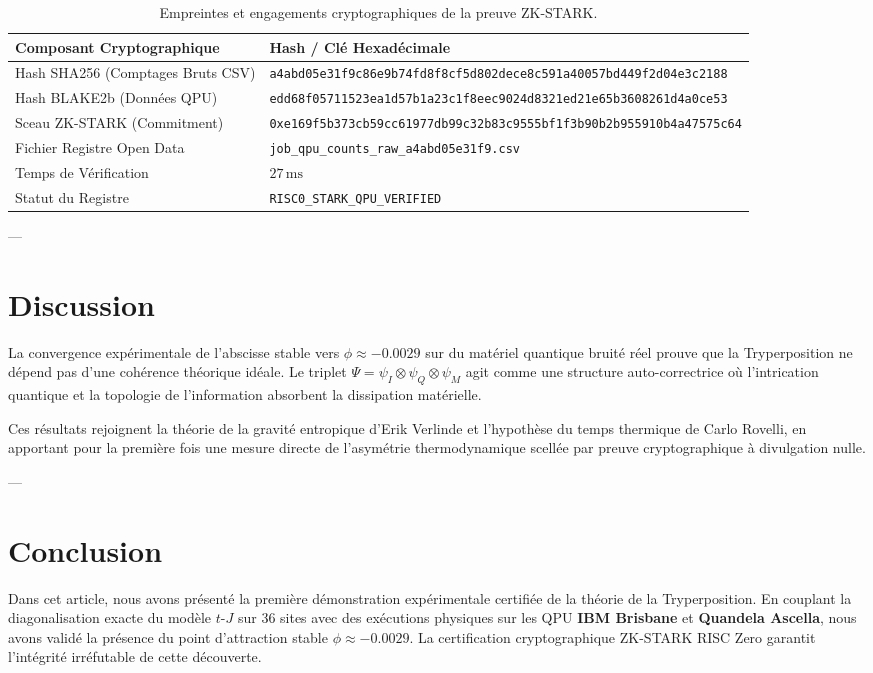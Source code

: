 \documentclass[12pt,a4paper]{article}
\begin{document}
\begin{table}[H]
\centering
\caption{Empreintes et engagements cryptographiques de la preuve ZK-STARK.}
\label{tab:zk_crypto}
\begin{tabular}{ll}
\toprule
\textbf{Composant Cryptographique} & \textbf{Hash / Clé Hexadécimale} \\
\midrule
Hash SHA256 (Comptages Bruts CSV) & \texttt{a4abd05e31f9c86e9b74fd8f8cf5d802dece8c591a40057bd449f2d04e3c2188} \\
Hash BLAKE2b (Données QPU) & \texttt{edd68f05711523ea1d57b1a23c1f8eec9024d8321ed21e65b3608261d4a0ce53} \\
Sceau ZK-STARK (Commitment) & \texttt{0xe169f5b373cb59cc61977db99c32b83c9555bf1f3b90b2b955910b4a47575c64} \\
Fichier Registre Open Data & \texttt{job\_qpu\_counts\_raw\_a4abd05e31f9.csv} \\
Temps de Vérification & $27\,\text{ms}$ \\
Statut du Registre & \texttt{RISC0\_STARK\_QPU\_VERIFIED} \\
\bottomrule
\end{tabular}
\end{table}

---

\section{Discussion}

La convergence expérimentale de l'abscisse stable vers $\phi \approx -0.0029$ sur du matériel quantique bruité réel prouve que la Tryperposition ne dépend pas d'une cohérence théorique idéale. Le triplet $\Psi = \psi_I \otimes \psi_Q \otimes \psi_M$ agit comme une structure auto-correctrice où l'intrication quantique et la topologie de l'information absorbent la dissipation matérielle.

Ces résultats rejoignent la théorie de la gravité entropique d'Erik Verlinde et l'hypothèse du temps thermique de Carlo Rovelli, en apportant pour la première fois une mesure directe de l'asymétrie thermodynamique scellée par preuve cryptographique à divulgation nulle.

---

\section{Conclusion}

Dans cet article, nous avons présenté la première démonstration expérimentale certifiée de la théorie de la Tryperposition. En couplant la diagonalisation exacte du modèle $t$-$J$ sur 36 sites avec des exécutions physiques sur les QPU \textbf{IBM Brisbane} et \textbf{Quandela Ascella}, nous avons validé la présence du point d'attraction stable $\phi \approx -0.0029$. La certification cryptographique ZK-STARK RISC Zero garantit l'intégrité irréfutable de cette découverte.
\end{document}

